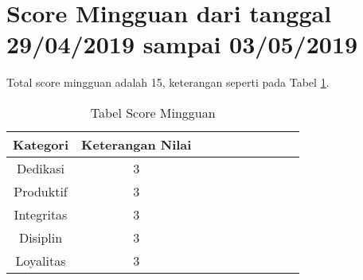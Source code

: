 \section{Score Mingguan dari tanggal 29/04/2019 sampai 03/05/2019}
Total score mingguan adalah 15,  keterangan seperti pada Tabel \ref{table:scoremingguan10}.
\begin{table}[!ht]
\centering
\begin{tabular}{ |c|c|c|c|c|c|c|c|c|c| }
\hline
Kategori & Keterangan Nilai \\
\hline
Dedikasi & 3 \\
\hline
Produktif & 3 \\
\hline
Integritas & 3 \\
\hline
Disiplin & 3 \\
\hline
Loyalitas & 3 \\
\hline
\end{tabular}
\caption{Tabel Score Mingguan}
\label{table:scoremingguan10}
\end{table}